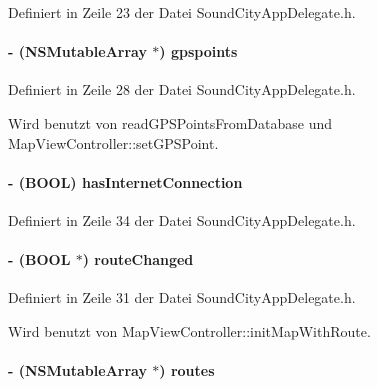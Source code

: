Definiert in Zeile 23 der Datei SoundCityAppDelegate.h.\hypertarget{interface_sound_city_app_delegate_a0edc5a15f6188d5a6a80e6f636690642}{
\paragraph[{gpspoints}]{\setlength{\rightskip}{0pt plus 5cm}-\/ (NSMutableArray $\ast$) gpspoints}\hfill}
\label{interface_sound_city_app_delegate_a0edc5a15f6188d5a6a80e6f636690642}


Definiert in Zeile 28 der Datei SoundCityAppDelegate.h.

Wird benutzt von readGPSPointsFromDatabase und MapViewController::setGPSPoint.\hypertarget{interface_sound_city_app_delegate_a076c894032a8dd5ceec3cd7161071863}{
\paragraph[{hasInternetConnection}]{\setlength{\rightskip}{0pt plus 5cm}-\/ (BOOL) hasInternetConnection}\hfill}
\label{interface_sound_city_app_delegate_a076c894032a8dd5ceec3cd7161071863}


Definiert in Zeile 34 der Datei SoundCityAppDelegate.h.\hypertarget{interface_sound_city_app_delegate_a35c584d369e69d0e25a8f62d713b3747}{
\paragraph[{routeChanged}]{\setlength{\rightskip}{0pt plus 5cm}-\/ (BOOL $\ast$) routeChanged}\hfill}
\label{interface_sound_city_app_delegate_a35c584d369e69d0e25a8f62d713b3747}


Definiert in Zeile 31 der Datei SoundCityAppDelegate.h.

Wird benutzt von MapViewController::initMapWithRoute.\hypertarget{interface_sound_city_app_delegate_aeac7ef371e675b53b754f6d9d02d183d}{
\paragraph[{routes}]{\setlength{\rightskip}{0pt plus 5cm}-\/ (NSMutableArray $\ast$) routes}\hfill}
\label{interface_sound_city_app_delegate_aeac7ef371e675b53b754f6d9d02d183d}


